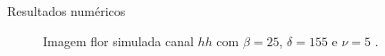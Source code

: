 \documentclass[10pt]{beamer}
\begin{document}
\begin{frame}{Resultados numéricos}
\begin{figure}[hbt]
	\caption{Imagem flor simulada canal $hh$ com $\beta = 25$, $\delta = 155$ e $\nu = 5$ .}
\endminipage\hfill
{}

\end{figure}
\end{frame}
\end{document}
